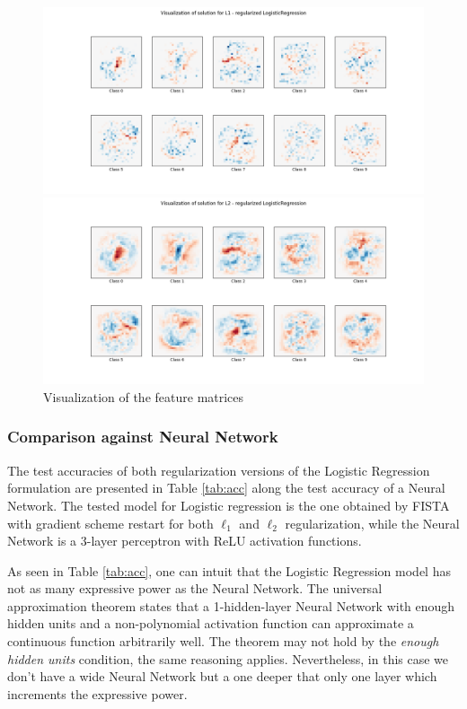 \documentclass{article}
\begin{document}
\begin{figure}[ht]
    \centering
    \begin{minipage}{.9\textwidth}
        \includegraphics[width=\textwidth]{img/visual_l1.png}
    \end{minipage}
    \begin{minipage}{.9\textwidth}
        \includegraphics[width=\textwidth]{img/visual_l2.png}
    \end{minipage}
    \caption{Visualization of the feature matrices}
    \label{fig:vis}
\end{figure}

\subsubsection*{Comparison against Neural Network}
The test accuracies of both regularization versions of the Logistic Regression formulation are presented in Table \ref{tab:acc} along the test accuracy of a Neural Network. The tested model for Logistic regression is the one obtained by FISTA with gradient scheme restart for both $\ell_1$ and $\ell_2$ regularization, while the Neural Network is a 3-layer perceptron with ReLU activation functions.

As seen in Table \ref{tab:acc}, one can intuit that the Logistic Regression model has not as many expressive power as the Neural Network. The universal approximation theorem states that a 1-hidden-layer Neural Network with enough hidden units and a non-polynomial activation function can approximate a continuous function arbitrarily well. The theorem may not hold by the \textit{enough hidden units} condition, the same reasoning applies. Nevertheless, in this case we don't have a wide Neural Network but a one deeper that only one layer which increments the expressive power.
\end{document}
